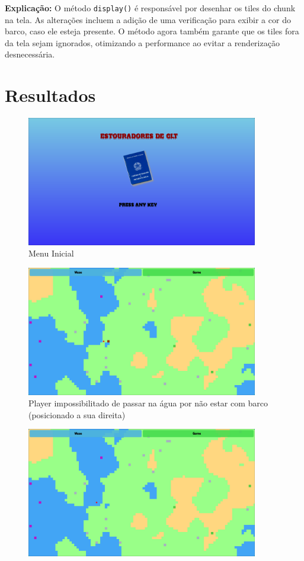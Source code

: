 \documentclass[
	12pt,				%
	oneside,			%
	a4paper,			%
	english,			%
	brazil,				%
	]{abntex2}
\begin{document}
{\textbf{Explicação:} O método \texttt{display()} é responsável por desenhar os tiles do chunk na tela. As alterações incluem a adição de uma verificação para exibir a cor do barco, caso ele esteja presente. O método agora também garante que os tiles fora da tela sejam ignorados, otimizando a performance ao evitar a renderização desnecessária.

\section{Resultados}

\begin{figure}[H]
\centering
\includegraphics[width=0.9\textwidth]{imgs/inicio.png}
\caption{Menu Inicial}
\label{imagem 0.9}
\end{figure}
\begin{figure}[H]
\centering
\includegraphics[width=0.9\textwidth]{imgs/agua.png}
\caption{Player impossibilitado de passar na água por não estar com barco (posicionado a sua direita)}
\label{imagem 5}
\end{figure}
\begin{figure}[H]
\centering
\includegraphics[width=0.9\textwidth]{imgs/agua-barco.png}

\end{figure}}
\end{document}
